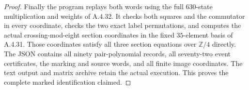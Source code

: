 \begin{proof}
Finally the program
replays both words using the full $630$-state
multiplication and weights of A.4.32.
It checks both squares and the commutator in every
coordinate, checks the two exact label permutations,
and computes the actual crossing-mod-eight section
coordinates in the fixed $35$-element basis of A.4.31.
Those coordinates satisfy all three section equations
over $\mathbb Z/4$ directly.
The JSON contains all ninety pair-polynomial records,
all seventy-two event certificates, the marking and
source words, and all finite image coordinates.
The text output and matrix archive retain the actual
execution.  This proves the complete marked
identification claimed.
\end{proof}
